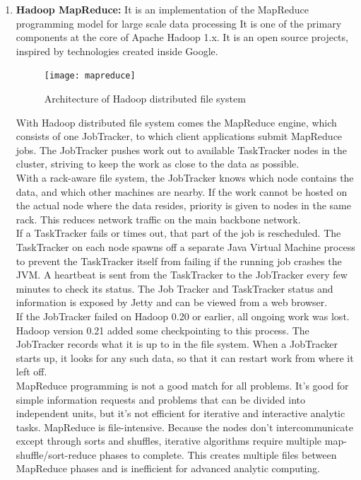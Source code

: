 \documentclass[a4paper,12pt,oneside]{report}
\begin{document}
\begin{enumerate}
        \item \textbf{Hadoop MapReduce:}
                It is an implementation of the MapReduce programming model for large scale data processing
                It is one of the primary components at the core of Apache Hadoop 1.x. It is an open source projects, inspired by technologies created inside Google.
                \begin{figure}[h!]
                        \centering
                        \texttt{[image: mapreduce]}
                        \caption{Architecture of Hadoop distributed file system}
                \end{figure}
                With Hadoop distributed file system comes the MapReduce engine, which consists of one JobTracker, to which client applications submit MapReduce jobs.
                The JobTracker pushes work out to available TaskTracker nodes in the cluster, striving to keep the work as close to the data as possible.
                \\
                With a rack-aware file system, the JobTracker knows which node contains the data, and which other machines are nearby. If the work cannot be hosted on the actual node where the data resides, priority is given to nodes in the same rack. This reduces network traffic on the main backbone network.
                \\
                If a TaskTracker fails or times out, that part of the job is rescheduled. The TaskTracker on each node spawns off a separate Java Virtual Machine process to prevent the TaskTracker itself from failing if the running job crashes the JVM. A heartbeat is sent from the TaskTracker to the JobTracker every few minutes to check its status. The Job Tracker and TaskTracker status and information is exposed by Jetty and can be viewed from a web browser.
                \\
                If the JobTracker failed on Hadoop 0.20 or earlier, all ongoing work was lost. Hadoop version 0.21 added some checkpointing to this process. The JobTracker records what it is up to in the file system. When a JobTracker starts up, it looks for any such data, so that it can restart work from where it left off.
                \\
                MapReduce programming is not a good match for all problems. It’s good for simple information requests and problems that can be divided into independent units, but it's not efficient for iterative and interactive analytic tasks. MapReduce is file-intensive. Because the nodes don’t intercommunicate except through sorts and shuffles, iterative algorithms require multiple map-shuffle/sort-reduce phases to complete. This creates multiple files between MapReduce phases and is inefficient for advanced analytic computing.


\end{enumerate}
\end{document}
